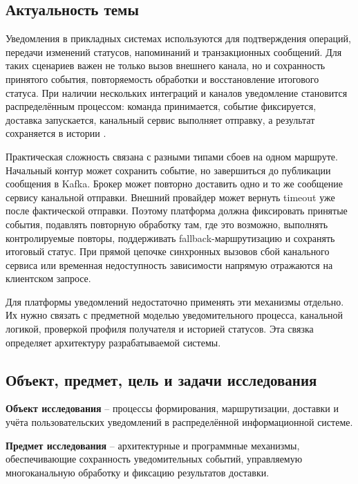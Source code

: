 \introduction

\subsection*{Актуальность темы}

Уведомления в прикладных системах используются для подтверждения операций, передачи изменений статусов, напоминаний и транзакционных сообщений. Для таких сценариев важен не только вызов внешнего канала, но и сохранность принятого события, повторяемость обработки и восстановление итогового статуса. При наличии нескольких интеграций и каналов уведомление становится распределённым процессом: команда принимается, событие фиксируется, доставка запускается, канальный сервис выполняет отправку, а результат сохраняется в истории \cite{kleppmann_ddia,newman_microservices}.

Практическая сложность связана с разными типами сбоев на одном маршруте. Начальный контур может сохранить событие, но завершиться до публикации сообщения в Kafka. Брокер может повторно доставить одно и то же сообщение сервису канальной отправки. Внешний провайдер может вернуть timeout уже после фактической отправки. Поэтому платформа должна фиксировать принятые события, подавлять повторную обработку там, где это возможно, выполнять контролируемые повторы, поддерживать fallback-маршрутизацию и сохранять итоговый статус. При прямой цепочке синхронных вызовов сбой канального сервиса или временная недоступность зависимости напрямую отражаются на клиентском запросе.

Для платформы уведомлений недостаточно применять эти механизмы отдельно. Их нужно связать с предметной моделью уведомительного процесса, канальной логикой, проверкой профиля получателя и историей статусов. Эта связка определяет архитектуру разрабатываемой системы.

\subsection*{Объект, предмет, цель и задачи исследования}

\textbf{Объект исследования} -- процессы формирования, маршрутизации, доставки и учёта пользовательских уведомлений в распределённой информационной системе.

\textbf{Предмет исследования} -- архитектурные и программные механизмы, обеспечивающие сохранность уведомительных событий, управляемую многоканальную обработку и фиксацию результатов доставки.

